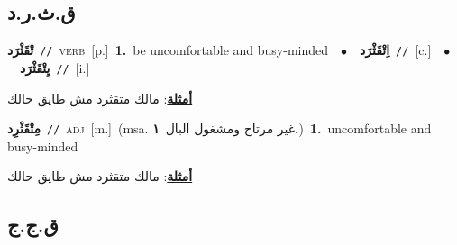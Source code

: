 \documentclass[10pt,a4paper,twoside]{article} %
\begin{document}
\begin{multicols}{2}
\vspace{-3mm}
\subsection*{\color{blue}\foreignlanguage{arabic}{ق.ث.ر.د}\color{blue}{}} 

{\setlength\topsep{0pt}\textbf{\foreignlanguage{arabic}{تْقَثْرَد}}\ {\color{gray}\texttt{//}\color{black}}\ \textsc{verb}\ [p.]\ \textbf{1.}~be uncomfortable and busy-minded\ \ $\bullet$\ \ \setlength\topsep{0pt}\textbf{\foreignlanguage{arabic}{اِتْقَثْرَد}}\ {\color{gray}\texttt{//}\color{black}}\ [c.]\ \ $\bullet$\ \ \setlength\topsep{0pt}\textbf{\foreignlanguage{arabic}{يِتْقَثْرَد}}\ {\color{gray}\texttt{//}\color{black}}\ [i.]\  \begin{flushright}\color{gray}\foreignlanguage{arabic}{\textbf{\underline{\foreignlanguage{arabic}{أمثلة}}}: مالك متقثرد مش طايق حالك}\end{flushright}\color{black}} \vspace{2mm}

{\setlength\topsep{0pt}\textbf{\foreignlanguage{arabic}{مِتْقَثْرِد}}\ {\color{gray}\texttt{//}\color{black}}\ \textsc{adj}\ [m.]\ \color{gray}(msa. \foreignlanguage{arabic}{غير مرتاح ومشغول البال}~\foreignlanguage{arabic}{\textbf{١.}})\color{black}\ \textbf{1.}~uncomfortable and busy-minded\  \begin{flushright}\color{gray}\foreignlanguage{arabic}{\textbf{\underline{\foreignlanguage{arabic}{أمثلة}}}: مالك متقثرد مش طايق حالك}\end{flushright}\color{black}} \vspace{2mm}

\vspace{-3mm}
\subsection*{\color{blue}\foreignlanguage{arabic}{ق.ج.ج}\color{blue}{}} 


\end{multicols}
\end{document}
